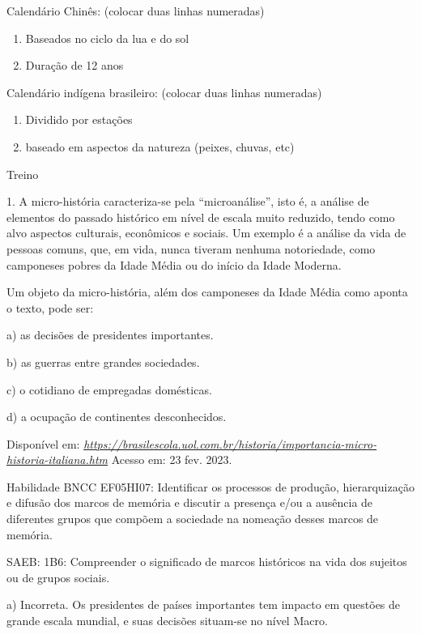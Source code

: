 Calendário Chinês: (colocar duas linhas numeradas)

\begin{enumerate}
\def\labelenumi{\arabic{enumi}.}
\item
  Baseados no ciclo da lua e do sol
\item
  Duração de 12 anos
\end{enumerate}

Calendário indígena brasileiro: (colocar duas linhas numeradas)

\begin{enumerate}
\def\labelenumi{\arabic{enumi}.}
\item
  Dividido por estações
\item
  baseado em aspectos da natureza (peixes, chuvas, etc)
\end{enumerate}

Treino

1. A micro-história caracteriza-se pela ``microanálise'', isto é, a
análise de elementos do passado histórico em nível de escala muito
reduzido, tendo como alvo aspectos culturais, econômicos e sociais. Um
exemplo é a análise da vida de pessoas comuns, que, em vida, nunca
tiveram nenhuma notoriedade, como camponeses pobres da Idade Média ou do
início da Idade Moderna.

Um objeto da micro-história, além dos camponeses da Idade Média como
aponta o texto, pode ser:

a) as decisões de presidentes importantes.

b) as guerras entre grandes sociedades.

c) o cotidiano de empregadas domésticas.

d) a ocupação de continentes desconhecidos.

Disponível em:
\href{https://brasilescola.uol.com.br/historia/importancia-micro-historia-italiana.htm}{\emph{https://brasilescola.uol.com.br/historia/importancia-micro-historia-italiana.htm}}
Acesso em: 23 fev. 2023.

Habilidade BNCC EF05HI07: Identificar os processos de produção,
hierarquização e difusão dos marcos de memória e discutir a presença
e/ou a ausência de diferentes grupos que compõem a sociedade na nomeação
desses marcos de memória.

SAEB: 1B6: Compreender o significado de marcos históricos na vida dos
sujeitos ou de grupos sociais.

a) Incorreta. Os presidentes de países importantes tem impacto em
questões de grande escala mundial, e suas decisões situam-se no nível
Macro.

